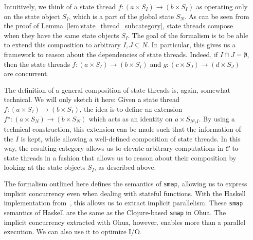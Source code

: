 Intuitively, we think of a state thread $f : (a \times S_I) \rightarrow (b \times S_I)$ as operating only on the state object $S_I$, which is a part of the global state $S_N$.
As can be seen from the proof of Lemma~\ref{lem:state_thread_subcategory}, state threads compose when they have the same state objects $S_I$.
The goal of the formalism is to be able to extend this composition to arbitrary $I,J \subseteq N$.
In particular, this gives us a framework to reason about the dependencies of state threads.
Indeed, if $I \cap J = \emptyset$, then the state threads $f : (a \times S_I) \rightarrow (b \times S_I)$ and $g : (c \times S_J) \rightarrow (d \times S_J)$ are concurrent.

The definition of a general composition of state threads is, again, somewhat technical. We will only sketch it here: Given a state thread $f : (a \times S_I) \rightarrow (b \times S_I)$,
the idea is to define an extension $f* : (a \times S_N) \rightarrow (b \times S_N)$ which acts as an identity on $a \times S_{N \setminus I}$. 
By using a technical construction, this extension can be made such that the information of the $I$ is kept, while allowing a well-defined composition of state threads.
In this way, the resulting category allows us to elevate arbitrary computations in $\mathcal{C}$ to state threads in a fashion that allows us to reason about their composition by looking at the state objects $S_I$,
as described above.

The formalism outlined here defines the semantics of \texttt{smap}, allowing us to express implicit concurrency even when dealing with stateful functions.
With the Haskell implementation from~\cite{ertel_haskell19}, this allows us to extract implicit parallelism.
These \texttt{smap} semantics of Haskell are the same as the Clojure-based \texttt{smap} in Ohua.
The implicit concurrency extracted with Ohua, however, enables more than a parallel execution.
We can also use it to optimize \ac{I/O}.
